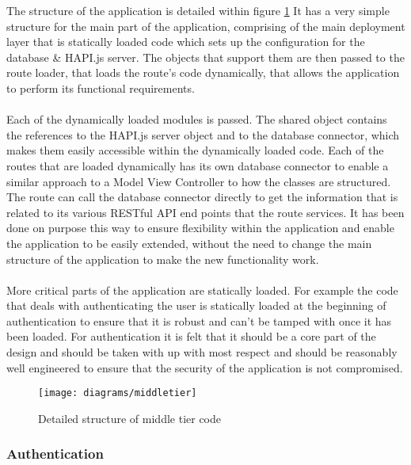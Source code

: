 The structure of the application is detailed within figure \ref{fig:middle_tier_code} It has a very simple structure for the main part of the application, comprising of the main deployment layer that is statically loaded code which sets up the configuration for the database \& HAPI.js server. The objects that support them are then passed to the route loader, that loads the route's code dynamically, that allows the application to perform its functional requirements.\\
\\
Each of the dynamically loaded modules is passed. The shared object contains the references to the HAPI.js server object and to the database connector, which makes them easily accessible within the dynamically loaded code. Each of the routes that are loaded dynamically has its own database connector to enable a similar approach to a Model View Controller to how the classes are structured. The route can call the database connector directly to get the information that is related to its various RESTful API end points that the route services. It has been done on purpose this way to ensure flexibility within the application and enable the application to be easily extended, without the need to change the main structure of the application to make the new functionality work.\\
\\
More critical parts of the application are statically loaded. For example the code that deals with authenticating the user is statically loaded at the beginning of authentication to ensure that it is robust and can't be tamped with once it has been loaded. For authentication it is felt that it should be a core part of the design and should be taken with up with most respect and should be reasonably well engineered to ensure that the security of the application is not compromised.
 
\begin{figure}[H]
    \centering
    \texttt{[image: diagrams/middletier]}
    \caption{Detailed structure of middle tier code}
    \label{fig:middle_tier_code}
\end{figure} 

\subsubsection*{Authentication}

